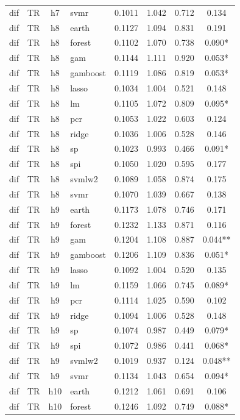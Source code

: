 \begin{ThreePartTable}
\begin{longtable}[t]{llclcccc}
dif & TR & h7 & svmr & 0.1011 & 1.042 & 0.712 & 0.134\\
\addlinespace
dif & TR & h8 & earth & 0.1127 & 1.094 & 0.831 & 0.191\\
dif & TR & h8 & forest & 0.1102 & 1.070 & 0.738 & 0.090*\\
dif & TR & h8 & gam & 0.1144 & 1.111 & 0.920 & 0.053*\\
dif & TR & h8 & gamboost & 0.1119 & 1.086 & 0.819 & 0.053*\\
dif & TR & h8 & lasso & 0.1034 & 1.004 & 0.521 & 0.148\\
dif & TR & h8 & lm & 0.1105 & 1.072 & 0.809 & 0.095*\\
dif & TR & h8 & pcr & 0.1053 & 1.022 & 0.603 & 0.124\\
dif & TR & h8 & ridge & 0.1036 & 1.006 & 0.528 & 0.146\\
dif & TR & h8 & sp & 0.1023 & 0.993 & 0.466 & 0.091*\\
dif & TR & h8 & spi & 0.1050 & 1.020 & 0.595 & 0.177\\
dif & TR & h8 & svmlw2 & 0.1089 & 1.058 & 0.874 & 0.175\\
dif & TR & h8 & svmr & 0.1070 & 1.039 & 0.667 & 0.138\\
\addlinespace
dif & TR & h9 & earth & 0.1173 & 1.078 & 0.746 & 0.171\\
dif & TR & h9 & forest & 0.1232 & 1.133 & 0.871 & 0.116\\
dif & TR & h9 & gam & 0.1204 & 1.108 & 0.887 & 0.044**\\
dif & TR & h9 & gamboost & 0.1206 & 1.109 & 0.836 & 0.051*\\
dif & TR & h9 & lasso & 0.1092 & 1.004 & 0.520 & 0.135\\
dif & TR & h9 & lm & 0.1159 & 1.066 & 0.745 & 0.089*\\
dif & TR & h9 & pcr & 0.1114 & 1.025 & 0.590 & 0.102\\
dif & TR & h9 & ridge & 0.1094 & 1.006 & 0.528 & 0.148\\
dif & TR & h9 & sp & 0.1074 & 0.987 & 0.449 & 0.079*\\
dif & TR & h9 & spi & 0.1072 & 0.986 & 0.441 & 0.068*\\
dif & TR & h9 & svmlw2 & 0.1019 & 0.937 & 0.124 & 0.048**\\
dif & TR & h9 & svmr & 0.1134 & 1.043 & 0.654 & 0.094*\\
\addlinespace
dif & TR & h10 & earth & 0.1212 & 1.061 & 0.691 & 0.106\\
dif & TR & h10 & forest & 0.1246 & 1.092 & 0.749 & 0.088*\\

\end{longtable}
\end{ThreePartTable}
